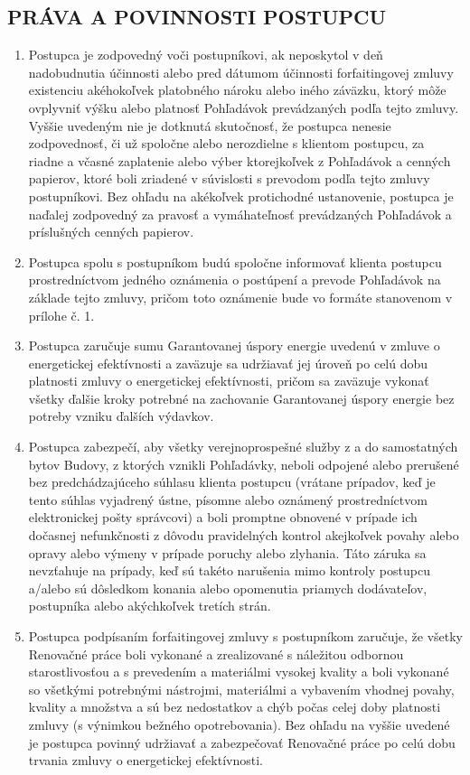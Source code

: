 \documentclass[a4paper]{article}
\begin{document}
\begin{multicols}{2}
\subsection{PRÁVA A POVINNOSTI POSTUPCU}
\begin{enumerate}
    \item{Postupca je zodpovedný voči postupníkovi, ak neposkytol v deň nadobudnutia účinnosti alebo pred dátumom účinnosti forfaitingovej zmluvy existenciu akéhokoľvek platobného nároku alebo iného záväzku, ktorý môže ovplyvniť výšku alebo platnosť Pohľadávok prevádzaných podľa tejto zmluvy. Vyššie uvedeným nie je dotknutá skutočnosť, že postupca nenesie zodpovednosť, či už spoločne alebo nerozdielne s klientom postupcu, za riadne a včasné zaplatenie alebo výber ktorejkoľvek z Pohľadávok a cenných papierov, ktoré boli zriadené v súvislosti s prevodom podľa tejto zmluvy postupníkovi. Bez ohľadu na akékoľvek protichodné ustanovenie, postupca je naďalej zodpovedný za pravosť a vymáhateľnosť prevádzaných Pohľadávok a príslušných cenných papierov.}
    \item{Postupca spolu s postupníkom budú spoločne informovať klienta postupcu prostredníctvom jedného oznámenia o postúpení a prevode Pohľadávok na základe tejto zmluvy, pričom toto oznámenie bude vo formáte stanovenom v prílohe č. 1.}
    \item{Postupca zaručuje sumu Garantovanej úspory energie uvedenú v zmluve o energetickej efektívnosti a zaväzuje sa udržiavať jej úroveň po celú dobu platnosti zmluvy o energetickej efektívnosti, pričom sa zaväzuje vykonať všetky ďalšie kroky potrebné na zachovanie Garantovanej úspory energie bez potreby vzniku ďalších výdavkov. }
    \item{Postupca zabezpečí, aby všetky verejnoprospešné  služby z a do samostatných bytov Budovy, z ktorých vznikli Pohľadávky, neboli odpojené alebo prerušené bez predchádzajúceho súhlasu klienta postupcu (vrátane prípadov, keď je tento súhlas vyjadrený ústne, písomne alebo oznámený prostredníctvom elektronickej pošty   správcovi) a boli promptne obnovené v prípade ich dočasnej nefunkčnosti z dôvodu pravidelných kontrol akejkoľvek povahy alebo opravy alebo výmeny v prípade poruchy alebo zlyhania. Táto záruka sa nevzťahuje na prípady, keď sú takéto narušenia mimo kontroly postupcu a/alebo sú dôsledkom konania alebo opomenutia priamych dodávateľov, postupníka alebo akýchkoľvek tretích strán.}
    \item{Postupca podpísaním forfaitingovej zmluvy s postupníkom zaručuje, že všetky Renovačné práce boli vykonané a zrealizované s náležitou odbornou starostlivosťou a s prevedením a materiálmi vysokej kvality a boli vykonané so všetkými potrebnými nástrojmi, materiálmi a vybavením vhodnej povahy, kvality a množstva a sú bez nedostatkov a chýb počas celej doby platnosti zmluvy (s výnimkou bežného opotrebovania). Bez ohľadu na vyššie uvedené je postupca povinný udržiavať a zabezpečovať Renovačné práce po celú dobu trvania zmluvy o energetickej efektívnosti. }

\end{enumerate}
\end{multicols}
\end{document}
